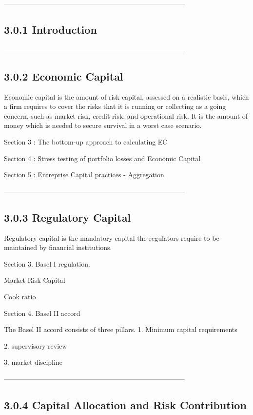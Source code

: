--------------------------------------------------------------------------------
\subsection{3.0.1 Introduction}




--------------------------------------------------------------------------------
\subsection{3.0.2 Economic Capital}

Economic capital is the amount of risk capital, assessed on a realistic basis, which a firm requires to cover the risks that it is running or collecting as a going concern, such as market risk, credit risk, and operational risk. It is the amount of money which is needed to secure survival in a worst case scenario.


Section 3 : The bottom-up approach to calculating EC

Section 4 : Stress testing of portfolio losses and Economic Capital

Section 5 : Entreprise Capital practices - Aggregation



--------------------------------------------------------------------------------
\subsection{3.0.3 Regulatory Capital}

Regulatory capital is the mandatory capital the regulators require to be maintained by financial institutions.


Section 3. Basel I regulation.


Market Risk Capital


Cook ratio


Section 4.  Basel II accord


The Basel II accord consists of three pillars.
1.
Minimum capital requirements

2.
supervisory review

3.
market discipline



--------------------------------------------------------------------------------
\subsection{3.0.4 Capital Allocation and Risk Contribution}


